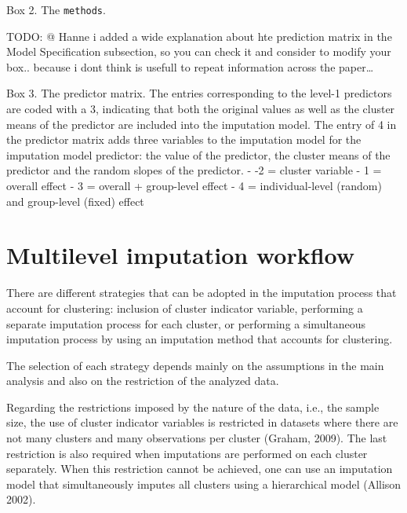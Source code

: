 \documentclass[
  article]{jss}
\begin{document}
\begin{tcolorbox}[enhanced jigsaw, opacityback=0, breakable, bottomrule=.15mm, colback=white, left=2mm, colframe=quarto-callout-color-frame, rightrule=.15mm, leftrule=.75mm, arc=.35mm, toprule=.15mm]

Box 2. The \texttt{methods}.

\end{tcolorbox}

\begin{tcolorbox}[enhanced jigsaw, opacityback=0, breakable, bottomrule=.15mm, colback=white, left=2mm, colframe=quarto-callout-color-frame, rightrule=.15mm, leftrule=.75mm, arc=.35mm, toprule=.15mm]

TODO: @ Hanne i added a wide explanation about hte prediction matrix in
the Model Specification subsection, so you can check it and consider to
modify your box.. because i dont think is usefull to repeat information
across the paper\ldots{}

Box 3. The predictor matrix. The entries corresponding to the level-1
predictors are coded with a 3, indicating that both the original values
as well as the cluster means of the predictor are included into the
imputation model. The entry of 4 in the predictor matrix adds three
variables to the imputation model for the imputation model predictor:
the value of the predictor, the cluster means of the predictor and the
random slopes of the predictor. - -2 = cluster variable - 1 = overall
effect - 3 = overall + group-level effect - 4 = individual-level
(random) and group-level (fixed) effect

\end{tcolorbox}

\hypertarget{sec-workflow}{%
\section{Multilevel imputation workflow}\label{sec-workflow}}

There are different strategies that can be adopted in the imputation
process that account for clustering: inclusion of cluster indicator
variable, performing a separate imputation process for each cluster, or
performing a simultaneous imputation process by using an imputation
method that accounts for clustering.\cite{zotero-516}

The selection of each strategy depends mainly on the assumptions in the
main analysis and also on the restriction of the analyzed data.

Regarding the restrictions imposed by the nature of the data, i.e., the
sample size, the use of cluster indicator variables is restricted in
datasets where there are not many clusters and many observations per
cluster (Graham, 2009). The last restriction is also required when
imputations are performed on each cluster separately. When this
restriction cannot be achieved, one can use an imputation model that
simultaneously imputes all clusters using a hierarchical model (Allison
2002).
\end{document}

